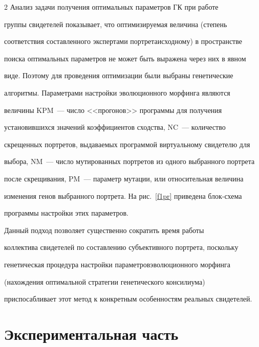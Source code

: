 \begin{multicols}{2}
     Анализ задачи получения оптимальных па\-ра\-мет\-ров ГК при работе 


группы свидетелей показывает, что оптимизируемая величина (степень 


соответствия составленного экспертами портрета\linebreak исходному) в пространстве 


поиска оптимальных па\-ра\-мет\-ров не может быть выражена через них в явном 


виде. Поэтому для проведения оптимизации были выбраны генетические 


алгоритмы. Параметрами настройки эволюционного морфинга являются 


величины KPM~--- чис\-ло <<прогонов>> программы для получения 


установившихся значений коэффициентов сходства, NC~--- количество 


скрещенных портретов, выдаваемых программой виртуальному свидетелю для 


выбора, NM~--- чис\-ло мутированных портретов из одного выбранного портрета 


после скрещивания, PM~--- параметр мутации, или относительная величина 


изменения генов выбранного портрета. На рис.~\ref{f1pr} приведена блок-схе\-ма 


программы настройки этих параметров.    


     


     Данный подход позволяет существенно сократить время работы 


коллектива свидетелей по со\-став\-ле\-нию субъективного портрета, поскольку 


генетическая процедура настройки параметров\linebreak эволюционного морфинга 


(нахождения оптимальной стратегии генетического консилиума) 


приспосабливает этот метод к конкретным особенностям реальных свидетелей.


     





\section{Экспериментальная часть}









\end{multicols}
